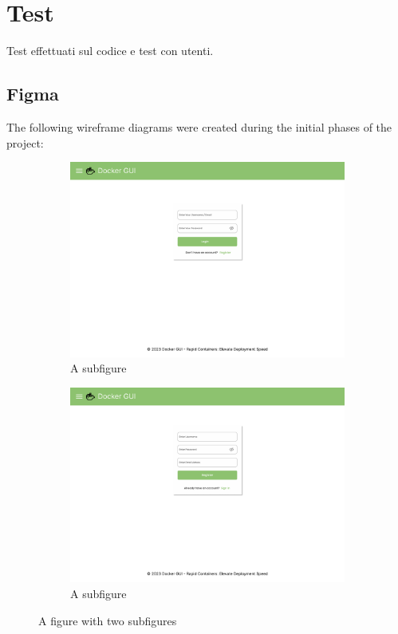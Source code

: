 \documentclass[multi, tikz]{article}
\begin{document}
\section{Test}
Test effettuati sul codice e test con utenti.
\subsection{Figma}
The following wireframe diagrams were created during the initial phases of the project:
\begin{figure}
  \centering
  \begin{subfigure}{.5\textwidth}
    \centering
    \includegraphics[width=.95\linewidth]{diagrams/1.login.pdf}
    \caption{A subfigure}
    \label{fig:sub1}
  \end{subfigure}%
  \begin{subfigure}{.5\textwidth}
    \centering
    \includegraphics[width=.95\linewidth]{diagrams/1.registration.pdf}
    \caption{A subfigure}
    \label{fig:sub2}
  \end{subfigure}
  \caption{A figure with two subfigures}
  \label{fig:test}
\end{figure}
\end{document}

